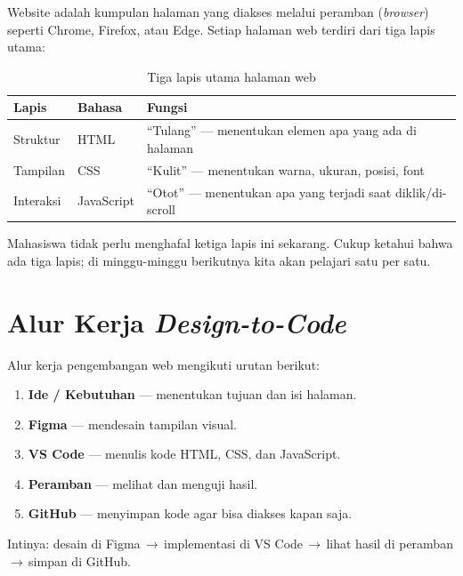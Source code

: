 Website adalah kumpulan halaman yang diakses melalui peramban (\emph{browser}) seperti Chrome, Firefox, atau Edge. Setiap halaman web terdiri dari tiga lapis utama:

\begin{table}[ht]
\centering
\caption{Tiga lapis utama halaman web}
\label{tab:m01-lapis}
\begin{tabular}{llp{7cm}}
\toprule
\textbf{Lapis} & \textbf{Bahasa} & \textbf{Fungsi} \\
\midrule
Struktur & HTML & ``Tulang'' — menentukan elemen apa yang ada di halaman \\
Tampilan & CSS & ``Kulit'' — menentukan warna, ukuran, posisi, font \\
Interaksi & JavaScript & ``Otot'' — menentukan apa yang terjadi saat diklik/di-scroll \\
\bottomrule
\end{tabular}
\end{table}

\begin{catatan}
Mahasiswa tidak perlu menghafal ketiga lapis ini sekarang. Cukup ketahui bahwa ada tiga lapis; di minggu-minggu berikutnya kita akan pelajari satu per satu.
\end{catatan}

\section{Alur Kerja \emph{Design-to-Code}}
\label{sec:m01-alur}

Alur kerja pengembangan web mengikuti urutan berikut:

\begin{enumerate}
  \item \textbf{Ide / Kebutuhan} — menentukan tujuan dan isi halaman.
  \item \textbf{Figma} — mendesain tampilan visual.
  \item \textbf{VS Code} — menulis kode HTML, CSS, dan JavaScript.
  \item \textbf{Peramban} — melihat dan menguji hasil.
  \item \textbf{GitHub} — menyimpan kode agar bisa diakses kapan saja.
\end{enumerate}

Intinya: desain di Figma\,$\rightarrow$\,implementasi di VS Code\,$\rightarrow$\,lihat hasil di peramban\,$\rightarrow$\,simpan di GitHub.


